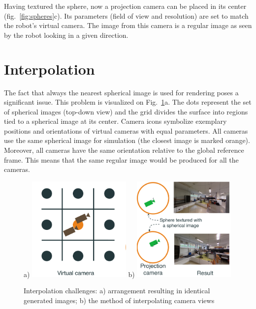 \documentclass{svproc}
\begin{document}
Having textured the sphere, now a projection camera can be placed in its center (fig.~\ref{fig:spheres}c).
Its parameters (field of view and resolution) are set to match the robot's virtual camera.
The image from this camera is a regular image as seen by the robot looking in a given direction.

\section{Interpolation}
\label{sec:iterpolate}


The fact that always the nearest spherical image is used for rendering poses a significant issue.
This problem is visualized on Fig.~\ref{fig:interpolation}a.
The dots represent the set of spherical images (top-down view) and the grid divides the surface into regions tied to a spherical image at its center.
Camera icons symbolize exemplary positions and orientations of virtual cameras with equal parameters.
All cameras use the same spherical image for simulation (the closest image is marked orange).
Moreover, all cameras have the same orientation relative to the global reference frame.
This means that the same regular image would be produced for all the cameras.

\begin{figure}[!ht]
    \centering
    a) \includegraphics[width=0.45\textwidth]{img/interpolation/virt.pdf}
    b) \includegraphics[width=0.45\textwidth]{img/interpolation/proj.pdf}
    \caption{Interpolation challenges: a) arrangement resulting in identical generated images; b) the method of interpolating camera views}
    \label{fig:interpolation}
\end{figure}
\end{document}
